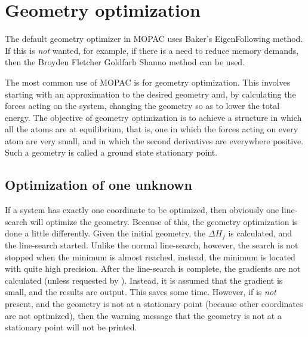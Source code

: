 \section{Geometry optimization}
The default geometry optimizer in MOPAC uses Baker's EigenFollowing method.  If
this is {\em not} wanted, for example, if there is a need to reduce memory
demands, then the Broyden Fletcher Goldfarb Shanno method can be used.

The most common use of MOPAC is for geometry optimization. This involves
starting with an approximation to the desired geometry and, by calculating the
forces acting on the system, changing the geometry so as to lower the total
energy. The objective of geometry optimization is to achieve a structure in
which all the atoms are at equilibrium, that is, one in which the forces acting
on every atom are very small, and in which the second derivatives are
everywhere positive.  Such a geometry is called a ground state stationary
point.




\subsection{Optimization of one unknown}
If a system has exactly one coordinate to be optimized, then obviously one
line-search will optimize the geometry.  Because of this, the geometry
optimization is done a little differently.  Given the initial geometry, the
$\Delta H_f$ is calculated, and the line-search started. Unlike the normal
line-search, however, the search is not stopped when the minimum is almost
reached, instead, the minimum is located with quite high precision.  After the
line-search is complete, the gradients are not  calculated
(unless requested by ). Instead, it is assumed that the
gradient is small, and the results are output.  This saves some time. However,
if  is {\em not} present, and the geometry is not at a
stationary point (because other coordinates are not optimized), then the
warning message that the geometry is not at a stationary point will not be
printed.



